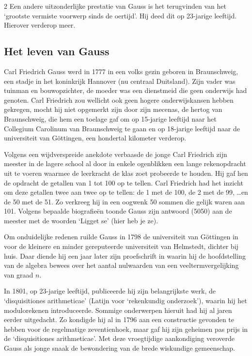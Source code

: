 \begin{multicols}{2}
	Een andere uitzonderlijke prestatie van Gauss is het terugvinden van het `grootste vermiste voorwerp sinds de oertijd'. Hij deed dit op 23-jarige leeftijd. Hierover verderop meer.
    \vfill\null
    \columnbreak
	
	\subsection*{Het leven van Gauss}
	
	Carl Friedrich Gauss werd in 1777 in een volks gezin geboren in Braunschweig, een stadje in het koninkrijk Hannover (nu centraal Duitsland). Zijn vader was tuinman en bouwopzichter, de moeder was een dienstmeid die geen onderwijs had genoten. Carl Friedrich zou wellicht ook geen hogere onderwijskansen hebben gekregen, mocht hij niet opgemerkt zijn door zijn mecenas, de hertog van Braunschweig, die hem een toelage gaf om op 15-jarige leeftijd naar het Collegium Carolinum van Braunschweig te gaan en op 18-jarige leeftijd naar de universiteit van Göttingen, een hondertal kilometer verderop.
	
	
	Volgens een wijdverspreide anekdote verbaasde de jonge Carl Friedrich zijn meester in de lagere school al door in enkele ogenblikken een lange rekenopdracht uit te voeren waarmee de leerkracht de klas zoet probeerde te houden. Hij gaf hen de opdracht de getallen van 1 tot 100 op te tellen. Carl Friedrich had het inzicht om deze getallen twee aan twee op te tellen: de 1 met de 100, de 2 met de 99, \ldots en de 50 met de 51. Zo verkreeg hij in een oogwenk 50 sommen die gelijk waren aan 101. Volgens bepaalde biografieën toonde Gauss zijn antwoord (5050) aan de meester met de woorden `Ligget se' (hier heb je ze).
	
	
	Om onduidelijke redenen ruilde Gauss in 1798 de universiteit van Göttingen in voor de kleinere en minder gereputeerde universiteit van Helmstedt, dichter bij huis. Daar diende hij een jaar later zijn proefschrift in waarin hij de hoofdstelling van de algebra bewees over het aantal nulwaarden van een veeltermvergelijking van graad $n$.
	
	In 1801, op 23-jarige leeftijd, publiceerde hij zijn belangrijkste werk, de `disquisitiones arithmeticae' (Latijn voor `rekenkundig onderzoek'), waarin hij het modulorekenen introduceerde. Sommige onderwerpen hieruit had hij al jaren eerder uitgedacht. Zo kondigde hij al in 1796 aan een constructie gevonden te hebben voor de regelmatige zeventienhoek, maar gaf hij zijn geheimen pas prijs in de `disquisitiones arithmeticae'. Met deze vroegtijdige aankondiging veroverde Gauss als jonge snaak de bewondering van de brede wiskundige gemeenschap.
	

\end{multicols}

